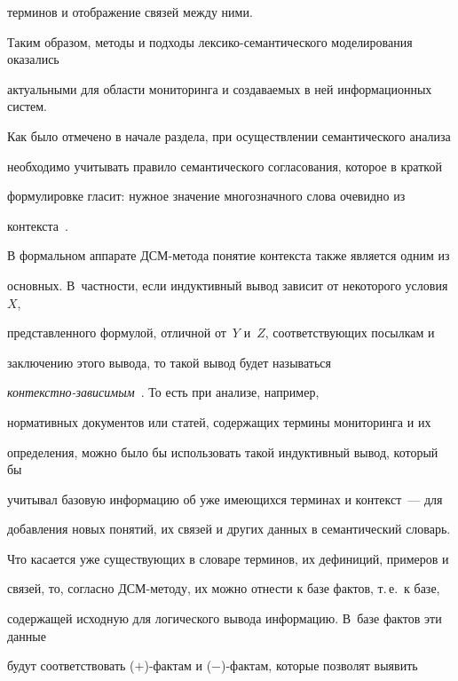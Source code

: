 терминов и отображение связей между ними.


   


   Таким образом, методы и подходы лексико-семантического моделирования оказались 


актуальными для области мониторинга и создаваемых в ней информационных систем.


   


   Как было отмечено  в начале раздела, при осуществлении семантического анализа 


необходимо учитывать правило семантического согласования, которое в краткой 


формулировке гласит: нужное значение многозначного слова очевидно из 


контекста~\cite{10-2-11, 12-2-11}.


   


   В формальном аппарате ДСМ-метода понятие контекста также является одним из 


основных. В~частности, если индуктивный вывод зависит от некоторого условия~$X$, 


представленного формулой, отличной от~$Y$ и~$Z$, соответ\-ст\-ву\-ющих посылкам и 


заключению этого вывода, то такой вывод будет называться 


   \textit{кон\-текст\-но-за\-ви\-си\-мым}~\cite{43-2-11}. То есть при анализе, например, 


нормативных документов или статей, содержащих термины мониторинга и их 


определения, можно было бы использовать такой индуктивный вывод, который бы 


учитывал базовую информацию об уже имеющихся терминах и контекст~--- для 


добавления новых понятий, их связей и других данных в семантический словарь.


   


   Что касается уже существующих в словаре терминов, их дефиниций, примеров и  


связей, то, согласно ДСМ-ме\-то\-ду, их можно отнести к базе фактов, т.\,е.\ к базе, 


содержащей исходную для логического вывода информацию. В~базе фактов эти данные 


будут соответствовать ($+$)-фак\-там и ($-$)-фак\-там, которые позволят выявить 


